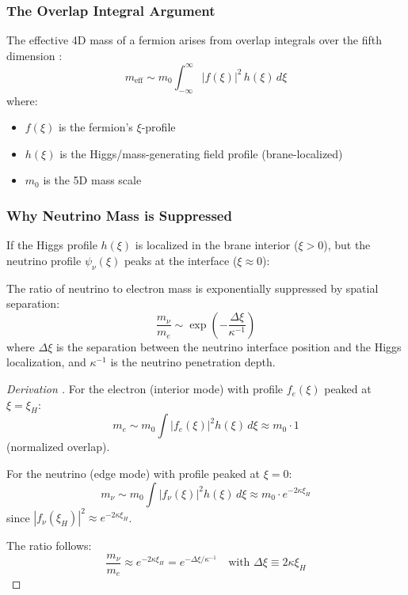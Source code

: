 \subsubsection{The Overlap Integral Argument}

The effective 4D mass of a fermion arises from overlap integrals over the
fifth dimension \tagBL{}:
\begin{equation}
    m_{\text{eff}} \sim m_0 \int_{-\infty}^{\infty} |f(\xi)|^2 \, h(\xi) \, d\xi
    \label{eq:ch6_overlap}
\end{equation}
where:
\begin{itemize}[nosep]
    \item $f(\xi)$ is the fermion's $\xi$-profile
    \item $h(\xi)$ is the Higgs/mass-generating field profile (brane-localized)
    \item $m_0$ is the 5D mass scale
\end{itemize}

\subsubsection{Why Neutrino Mass is Suppressed}

If the Higgs profile $h(\xi)$ is localized in the brane interior ($\xi > 0$),
but the neutrino profile $\psi_\nu(\xi)$ peaks at the interface ($\xi \approx 0$):

\begin{proposition}
\label{prop:ch6_suppression}
The ratio of neutrino to electron mass is exponentially suppressed by
spatial separation:
\begin{equation}
    \frac{m_\nu}{m_e} \sim \exp\left(-\frac{\Delta\xi}{\kappa^{-1}}\right)
    \label{eq:ch6_mass_ratio}
\end{equation}
where $\Delta\xi$ is the separation between the neutrino interface position
and the Higgs localization, and $\kappa^{-1}$ is the neutrino penetration depth.
\end{proposition}

\begin{proof}[Derivation \tagDc{}]
For the electron (interior mode) with profile $f_e(\xi)$ peaked at $\xi = \xi_H$:
\begin{equation}
    m_e \sim m_0 \int |f_e(\xi)|^2 h(\xi) \, d\xi \approx m_0 \cdot 1
\end{equation}
(normalized overlap).

For the neutrino (edge mode) with profile peaked at $\xi = 0$:
\begin{equation}
    m_\nu \sim m_0 \int |f_\nu(\xi)|^2 h(\xi) \, d\xi
    \approx m_0 \cdot e^{-2\kappa \xi_H}
\end{equation}
since $|f_\nu(\xi_H)|^2 \approx e^{-2\kappa \xi_H}$.

The ratio follows:
\begin{equation}
    \frac{m_\nu}{m_e} \approx e^{-2\kappa \xi_H} = e^{-\Delta\xi/\kappa^{-1}}
    \quad \text{with } \Delta\xi \equiv 2\kappa \xi_H
\end{equation}
\end{proof}

